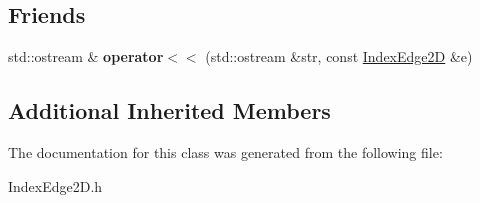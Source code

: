 \subsection*{Friends}
\begin{DoxyCompactItemize}
\item 
std\+::ostream \& {\bfseries operator$<$$<$} (std\+::ostream \&str, const \hyperlink{classcmst_1_1_index_edge2_d}{Index\+Edge2D} \&e)\hypertarget{classcmst_1_1_index_edge2_d_a07a17f57bc3f2f18232965531f0b62b4}{}\label{classcmst_1_1_index_edge2_d_a07a17f57bc3f2f18232965531f0b62b4}

\end{DoxyCompactItemize}
\subsection*{Additional Inherited Members}


The documentation for this class was generated from the following file\+:\begin{DoxyCompactItemize}
\item 
Index\+Edge2\+D.\+h\end{DoxyCompactItemize}
